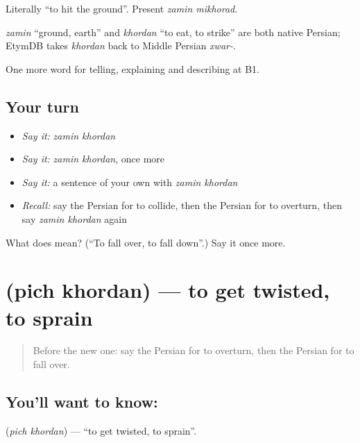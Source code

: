 Literally \textquotedblleft{}to hit the ground\textquotedblright{}. Present \emph{zamin mikhorad}.

\begin{cousinweb}
\emph{zamin} \textquotedblleft{}ground, earth\textquotedblright{} and \emph{khordan} \textquotedblleft{}to eat, to strike\textquotedblright{} are both native Persian; EtymDB takes \emph{khordan} back to Middle Persian \emph{xwar-}.
\end{cousinweb}

\begin{grammarlens}[title={What you've built}]
One more word for telling, explaining and describing at B1.
\end{grammarlens}

\subsection*{Your turn}
\begin{itemize}
\raggedright
  \item \emph{Say it:} \emph{zamin khordan}
  \item \emph{Say it:} \emph{zamin khordan}, once more
  \item \emph{Say it:} a sentence of your own with \emph{zamin khordan}
  \item \emph{Recall:} say the Persian for to collide, then the Persian for to overturn, then say \emph{zamin khordan} again
\end{itemize}

\begin{tcolorbox}[breakable,colback=teal!4,colframe=teal!35!black,title={Before you move on}]
What does   mean? (\textquotedblleft{}To fall over, to fall down\textquotedblright{}.) Say it once more.
\end{tcolorbox}
\section[\texorpdfstring{\fa{پیچ} \fa{خوردن} (pich khordan)}{پیچ خوردن (pich khordan)}]{  (pich khordan) — to get twisted, to sprain}

\label{lesson:FA-C325-pich-khordan}



\begin{quote}
Before the new one: say the Persian for to overturn, then the Persian for to fall over.
\end{quote}

\subsection*{You'll want to know:  }
\textbf{ } (\emph{pich khordan}) — \textquotedblleft{}to get twisted, to sprain\textquotedblright{}.

